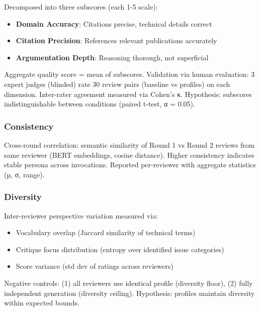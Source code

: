Decomposed into three subscores (each 1-5 scale):

\begin{itemize}
\item \textbf{Domain Accuracy}: Citations precise, technical details correct
\item \textbf{Citation Precision}: References relevant publications accurately
\item \textbf{Argumentation Depth}: Reasoning thorough, not superficial
\end{itemize}

Aggregate quality score = mean of subscores. Validation via human evaluation: 3 expert judges (blinded) rate 30 review pairs (baseline vs profiles) on each dimension. Inter-rater agreement measured via Cohen's κ. Hypothesis: subscores indistinguishable between conditions (paired t-test, α = 0.05).

\subsubsection{Consistency}

Cross-round correlation: semantic similarity of Round 1 vs Round 2 reviews from same reviewer (BERT embeddings, cosine distance). Higher consistency indicates stable persona across invocations. Reported per-reviewer with aggregate statistics (µ, σ, range).

\subsubsection{Diversity}

Inter-reviewer perspective variation measured via:
\begin{itemize}
\item Vocabulary overlap (Jaccard similarity of technical terms)
\item Critique focus distribution (entropy over identified issue categories)
\item Score variance (std dev of ratings across reviewers)
\end{itemize}

Negative controls: (1) all reviewers use identical profile (diversity floor), (2) fully independent generation (diversity ceiling). Hypothesis: profiles maintain diversity within expected bounds.
